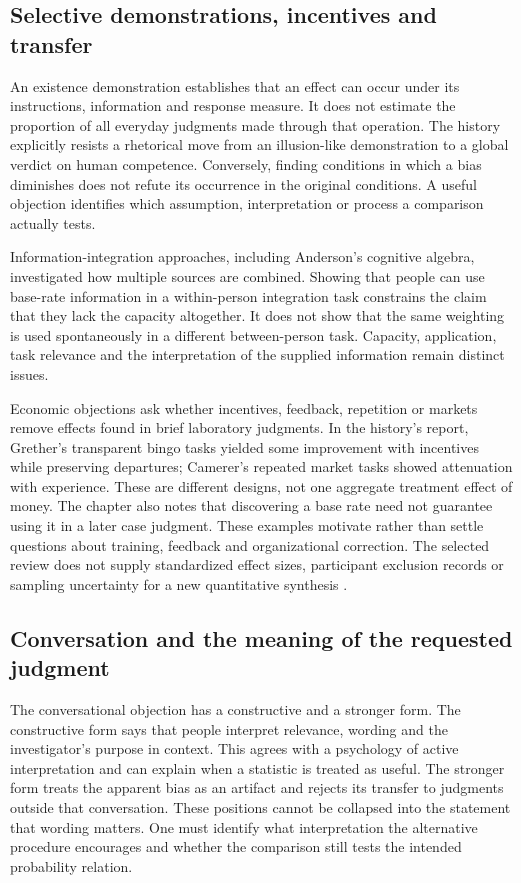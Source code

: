 \subsection{Selective demonstrations, incentives and transfer}

An existence demonstration establishes that an effect can occur under
its instructions, information and response measure. It does not estimate
the proportion of all everyday judgments made through that operation.
The history explicitly resists a rhetorical move from an illusion-like
demonstration to a global verdict on human competence. Conversely, finding
conditions in which a bias diminishes does not refute its occurrence in
the original conditions. A useful objection identifies which assumption,
interpretation or process a comparison actually tests.

Information-integration approaches, including Anderson's cognitive
algebra, investigated how multiple sources are combined. Showing that
people can use base-rate information in a within-person integration task
constrains the claim that they lack the capacity altogether. It does not
show that the same weighting is used spontaneously in a different
between-person task. Capacity, application, task relevance and the
interpretation of the supplied information remain distinct issues.

Economic objections ask whether incentives, feedback, repetition or
markets remove effects found in brief laboratory judgments. In the
history's report, Grether's transparent bingo tasks yielded some improvement
with incentives while preserving departures; Camerer's repeated market
tasks showed attenuation with experience. These are different designs,
not one aggregate treatment effect of money. The chapter also notes
that discovering a base rate need not guarantee using it in a later case
judgment. These examples motivate rather than settle questions about
training, feedback and organizational correction. The selected review
does not supply standardized effect sizes, participant exclusion records
or sampling uncertainty for a new quantitative synthesis
\cite[pp.~334--335]{GriffinEtAl2012HeuristicsHistory}.

\subsection{Conversation and the meaning of the requested judgment}

The conversational objection has a constructive and a stronger form.
The constructive form says that people interpret relevance, wording and
the investigator's purpose in context. This agrees with a psychology of
active interpretation and can explain when a statistic is treated as
useful. The stronger form treats the apparent bias as an artifact and
rejects its transfer to judgments outside that conversation. These
positions cannot be collapsed into the statement that wording matters.
One must identify what interpretation the alternative procedure encourages
and whether the comparison still tests the intended probability relation.

